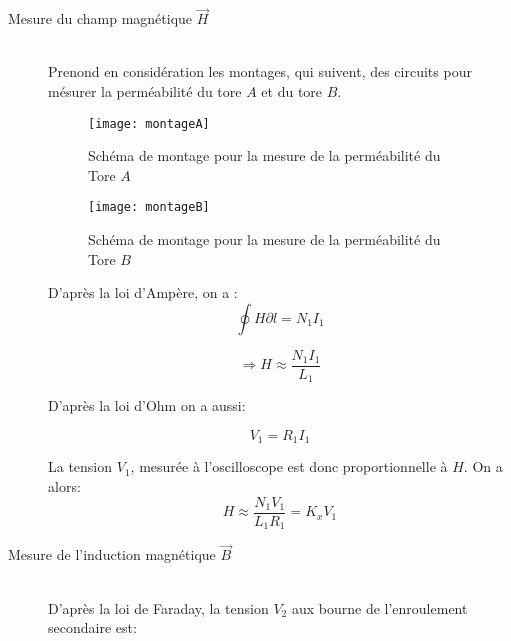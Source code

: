 \documentclass{article}
\begin{document}
\begin{description} 
\item[Mesure du champ magnétique $\vec{H}$] \hfill \\

Prenond en considération les montages, qui suivent, des circuits pour mésurer la perméabilité du tore $A$ et du tore $B$.

\begin{figure}[ht]
\begin{center}
\texttt{[image: montageA]}
\caption{Schéma de montage pour la mesure de la perméabilité du Tore $A$}
\label{fig:montage1}
\end{center}
\end{figure}

\begin{figure}[ht]
\begin{center}
\texttt{[image: montageB]}
\caption{Schéma de montage pour la mesure de la perméabilité du Tore $B$}
\label{fig:montage2}
\end{center}
\end{figure}

\pagebreak
D'après la loi d'Ampère, on a : \\

\begin{equation}
\oint H\partial l = N_1 I_1
\end{equation}

\begin{equation}
\Rightarrow H \approx \frac{N_1 I_1}{L_1}
\end{equation}

D'après la loi d'Ohm on a aussi:

\begin{equation}
V_1 = R_1 I_1
\end{equation}

La tension $V_1$, mesurée à l'oscilloscope est donc proportionnelle à $H$. On a alors:\\

\begin{equation}
H \approx \frac{N_1 V_1}{L_1 R_1} = K_x V_1
\end{equation}


\item[Mesure de l'induction magnétique $\vec{B}$] \hfill \\

D'après la loi de Faraday, la tension $V_2$ aux bourne de l'enroulement secondaire est:\\


\end{description}
\end{document}
